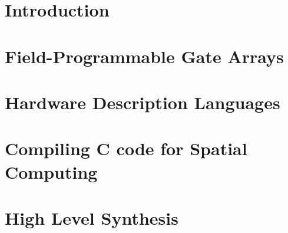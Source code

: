 \section{Introduction}
\label{reconfigurableComputing:introduction}


\section{Field-Programmable Gate Arrays}
\label{fpga}


\section{Hardware Description Languages}
\label{hdl}


\section{Compiling C code for Spatial Computing}
\label{cForSpatial}


\section{High Level Synthesis}
\label{hls}
